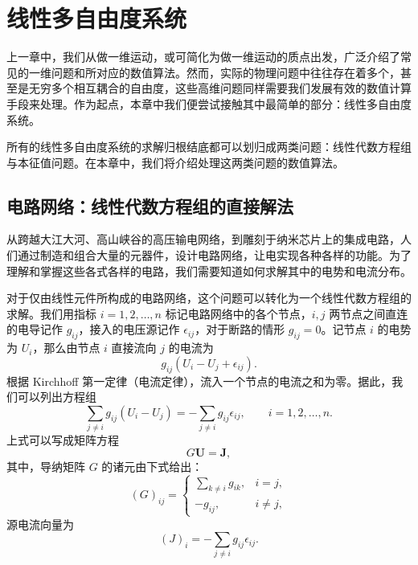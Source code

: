 \chapter{线性多自由度系统}

上一章中，我们从做一维运动，或可简化为做一维运动的质点出发，广泛介绍了常见的一维问题和所对应的数值算法。然而，实际的物理问题中往往存在着多个，甚至是无穷多个相互耦合的自由度，这些高维问题同样需要我们发展有效的数值计算手段来处理。作为起点，本章中我们便尝试接触其中最简单的部分：线性多自由度系统。

所有的线性多自由度系统的求解归根结底都可以划归成两类问题：线性代数方程组与本征值问题。在本章中，我们将介绍处理这两类问题的数值算法。

\section{电路网络：线性代数方程组的直接解法}

从跨越大江大河、高山峡谷的高压输电网络，到雕刻于纳米芯片上的集成电路，人们通过制造和组合大量的元器件，设计电路网络，让电实现各种各样的功能。为了理解和掌握这些各式各样的电路，我们需要知道如何求解其中的电势和电流分布。

对于仅由线性元件所构成的电路网络，这个问题可以转化为一个线性代数方程组的求解。我们用指标 $i=1,2,\ldots,n$ 标记电路网络中的各个节点，$i,j$ 两节点之间直连的电导记作 $g_{ij}$，接入的电压源记作 $\epsilon_{ij}$，对于断路的情形 $g_{ij}=0$。记节点 $i$ 的电势为 $U_i$，那么由节点 $i$ 直接流向 $j$ 的电流为
\begin{equation}
g_{ij}(U_i-U_j+\epsilon_{ij}).
\tag{3.1.1}
\end{equation}
根据 Kirchhoff 第一定律（电流定律），流入一个节点的电流之和为零。据此，我们可以列出方程组
\begin{equation}
\sum_{j\ne i}g_{ij}(U_i-U_j)=-\sum_{j\ne i}g_{ij}\epsilon_{ij},\qquad i=1,2,\ldots,n.
\tag{3.1.2}
\end{equation}
上式可以写成矩阵方程
\begin{equation}
G\bm U=\bm J,
\tag{3.1.3}
\end{equation}
其中，导纳矩阵 $G$ 的诸元由下式给出：
\begin{equation}
(G)_{ij}=\begin{cases}
\displaystyle\sum_{k\ne i}g_{ik},&i=j,\\[1ex]
-g_{ij},&i\ne j,
\end{cases}
\tag{3.1.4}
\end{equation}
源电流向量为
\begin{equation}
(J)_i=-\sum_{j\ne i}g_{ij}\epsilon_{ij}.
\tag{3.1.5}
\end{equation}

